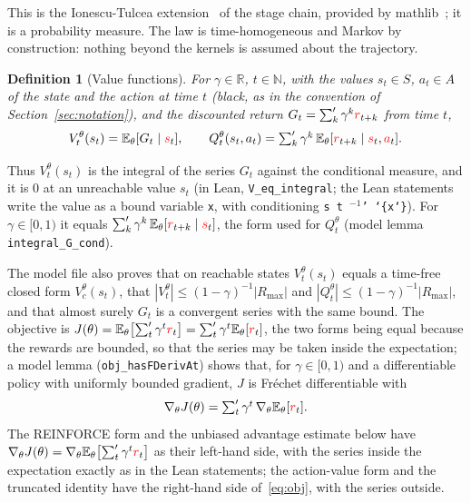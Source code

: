 \documentclass[11pt,a4paper]{article}
\newtheorem{definition}[theorem]{Definition}
\newcommand{\R}{\mathbb{R}}
\newcommand{\N}{\mathbb{N}}
\newcommand{\E}{\mathbb{E}}
\newcommand{\rv}[1]{{\color{red}#1}}       %
\newcommand{\sv}{\rv{s}}
\newcommand{\av}{\rv{a}}
\newcommand{\rw}{\rv{r}}
\newcommand{\grad}{\nabla_{\theta}}
\newcommand{\tsum}{\textstyle\sum'}
\begin{document}
This is the Ionescu-Tulcea extension~\cite{kallenberg2002foundations} of the stage chain, provided by mathlib~\cite{mathlib}; it is a probability measure.
The law is time-homogeneous and Markov by construction: nothing beyond the kernels is assumed about the trajectory.

\begin{definition}[Value functions]
For $\gamma\in\R$, $t\in\N$, with the values $s_t\in S$, $a_t\in A$ of the state and the action at time $t$ (black, as in the convention of Section~\ref{sec:notation}), and the discounted return $G_t=\tsum_k\gamma^k\rw_{t+k}$ from time $t$,
\[
V_t^\theta(s_t)=\E_\theta[G_t\mid\sv_t],\qquad
Q_t^\theta(s_t,a_t)=\tsum_{k}\gamma^k\,\E_\theta[\rw_{t+k}\mid\sv_t,\av_t].
\]
\end{definition}
Thus $V_t^\theta(s_t)$ is the integral of the series $G_t$ against the conditional measure, and it is $0$ at an unreachable value $s_t$ (in Lean, \texttt{V\_eq\_integral}; the Lean statements write the value as a bound variable \texttt{x}, with conditioning \texttt{s t $^{-1}$' \char`\{x\char`\}}).
For $\gamma\in[0,1)$ it equals $\tsum_k\gamma^k\,\E_\theta[\rw_{t+k}\mid\sv_t]$, the form used for $Q_t^\theta$ (model lemma \texttt{integral\_G\_cond}).

The model file also proves that on reachable states $V_t^\theta(s_t)$ equals a time-free closed form $V^\theta_c(s_t)$, that $|V_t^\theta|\le(1-\gamma)^{-1}|R_{\max}|$ and $|Q_t^\theta|\le(1-\gamma)^{-1}|R_{\max}|$, and that almost surely $G_t$ is a convergent series with the same bound.
The objective is $J(\theta)=\E_\theta\bigl[\tsum_t\gamma^t\rw_t\bigr]=\tsum_t\gamma^t\E_\theta[\rw_t]$, the two forms being equal because the rewards are bounded, so that the series may be taken inside the expectation; a model lemma (\texttt{obj\_hasFDerivAt}) shows that, for $\gamma\in[0,1)$ and a differentiable policy with uniformly bounded gradient, $J$ is Fr\'echet differentiable with
\begin{equation}
\label{eq:obj}
\grad J(\theta)=\tsum_t\gamma^t\,\grad\E_\theta[\rw_t].
\end{equation}
The REINFORCE form and the unbiased advantage estimate below have $\grad J(\theta)=\grad\E_\theta\bigl[\tsum_t\gamma^t\rw_t\bigr]$ as their left-hand side, with the series inside the expectation exactly as in the Lean statements; the action-value form and the truncated identity have the right-hand side of~\eqref{eq:obj}, with the series outside.
\end{document}
